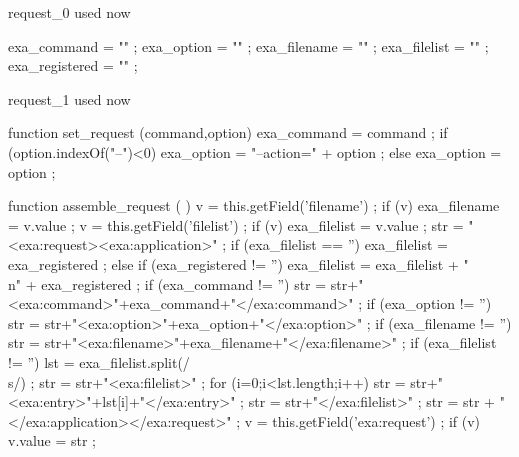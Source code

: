 
\startJSpreamble request_0 used now

    exa_command    = "" ;
    exa_option     = "" ;
    exa_filename   = "" ;
    exa_filelist   = "" ;
    exa_registered = "" ;

\stopJSpreamble

\startJSpreamble request_1 used now

    function set_request (command,option) {
        exa_command = command ;
        if (option.indexOf("--")<0) {
            exa_option = "--action=" + option ;
        } else {
            exa_option = option ;
        }
    }

    function assemble_request ( ) {
        v = this.getField('filename') ;
        if (v) {
            exa_filename = v.value ;
        }
        v = this.getField('filelist') ;
        if (v) {
            exa_filelist = v.value ;
        }
        str = "<exa:request><exa:application>" ;
        if (exa_filelist == '') {
            exa_filelist = exa_registered ;
        } else {
            if (exa_registered != '') {
                exa_filelist = exa_filelist + "\\n" + exa_registered ;
            }
        }
        if (exa_command != '') {
            str = str+"<exa:command>"+exa_command+"</exa:command>" ;
        }
        if (exa_option != '') {
            str = str+"<exa:option>"+exa_option+"</exa:option>" ;
        }
        if (exa_filename != '') {
            str = str+"<exa:filename>"+exa_filename+"</exa:filename>" ;
        }
        if (exa_filelist != '') {
            lst = exa_filelist.split(/\\s/) ;
            str = str+"<exa:filelist>" ;
            for (i=0;i<lst.length;i++) {
                str = str+"<exa:entry>"+lst[i]+"</exa:entry>" ;
            }
            str = str+"</exa:filelist>" ;
        }
        str = str + "</exa:application></exa:request>" ;
        v = this.getField('exa:request') ;
        if (v) {
            v.value = str ;
        }
    }

